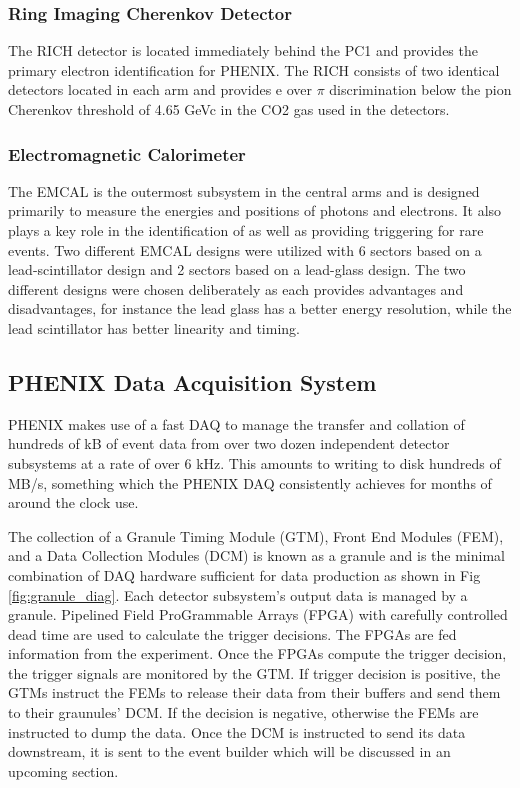 \subsubsection{Ring Imaging Cherenkov Detector}
The RICH detector is located immediately behind the PC1 and provides the primary electron identification for PHENIX. The RICH consists of two identical detectors located in each arm and provides e over $\pi$ discrimination below the pion Cherenkov threshold of 4.65 GeVc in the CO2 gas used in the detectors.
\subsubsection{Electromagnetic Calorimeter}
The EMCAL is the outermost subsystem in the central arms and is designed primarily to measure the energies and positions of photons and electrons. It also plays a key role in the identification of as well as providing triggering for rare events. Two different EMCAL designs were utilized with 6 sectors based on a lead-scintillator design and 2 sectors based on a lead-glass design. The two different designs were chosen deliberately as each provides advantages and disadvantages, for instance the lead glass has a better energy resolution, while the lead scintillator has better linearity and timing.
\subsection{PHENIX Data Acquisition System}
\label{sec:PHENIX_DAQ}
PHENIX makes use of a fast DAQ to manage the transfer and collation of hundreds of kB of event data from over two dozen independent detector subsystems at a rate of over 6 kHz. This amounts to writing to disk hundreds of MB/s, something which the PHENIX DAQ consistently achieves for months of around the clock use. 

The collection of a  Granule Timing Module (GTM), Front End Modules (FEM), and a Data Collection Modules (DCM) is known as a granule and is the minimal combination of DAQ hardware sufficient for data production as shown in Fig \ref{fig:granule_diag}. Each detector subsystem's output data is managed by a granule. Pipelined Field ProGrammable Arrays (FPGA) with carefully controlled dead time are used to calculate the trigger decisions. The FPGAs are fed information from the experiment. Once the FPGAs compute the trigger decision, the trigger signals are monitored by the GTM. If trigger decision is positive, the GTMs instruct the FEMs to release their data from their buffers and send them to their graunules' DCM. If the decision is negative, otherwise the FEMs are instructed to dump the data.  Once the DCM is instructed to send its data downstream, it is sent to the event builder which will be discussed in an upcoming section.


